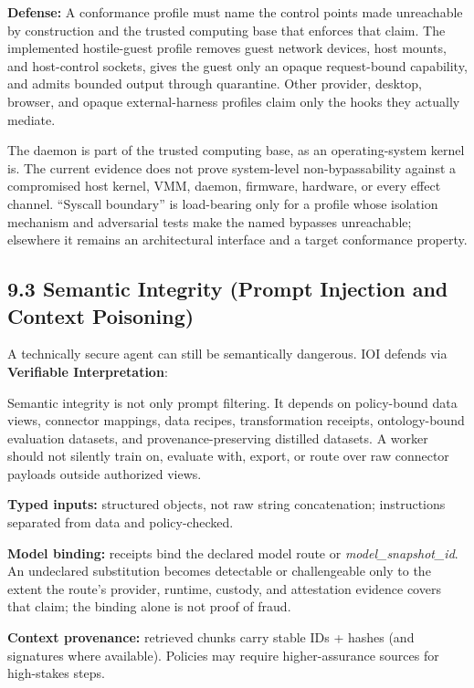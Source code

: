 \documentclass[
  11pt,
]{article}
\begin{document}
\textbf{Defense:} A conformance profile must name the control points made
unreachable by construction and the trusted computing base that enforces that
claim. The implemented hostile-guest profile removes guest network devices,
host mounts, and host-control sockets, gives the guest only an opaque
request-bound capability, and admits bounded output through quarantine. Other
provider, desktop, browser, and opaque external-harness profiles claim only the
hooks they actually mediate.

The daemon is part of the trusted computing base, as an operating-system kernel
is. The current evidence does not prove system-level non-bypassability against
a compromised host kernel, VMM, daemon, firmware, hardware, or every effect
channel. ``Syscall boundary'' is load-bearing only for a profile whose isolation
mechanism and adversarial tests make the named bypasses unreachable; elsewhere
it remains an architectural interface and a target conformance property.

\hypertarget{semantic-integrity-prompt-injection-and-context-poisoning}{%
\subsection{9.3 Semantic Integrity (Prompt Injection and Context
Poisoning)}\label{semantic-integrity-prompt-injection-and-context-poisoning}}

A technically secure agent can still be semantically dangerous. IOI
defends via \textbf{Verifiable Interpretation}:

Semantic integrity is not only prompt filtering. It depends on
policy-bound data views, connector mappings, data recipes,
transformation receipts, ontology-bound evaluation datasets, and
provenance-preserving distilled datasets. A worker should not silently
train on, evaluate with, export, or route over raw connector payloads
outside authorized views.

\textbf{Typed inputs: }structured objects, not raw string concatenation;
instructions separated from data and policy-checked.

\textbf{Model binding: }receipts bind the declared model route or
\emph{model\_snapshot\_id}. An undeclared substitution becomes detectable or
challengeable only to the extent the route's provider, runtime, custody, and
attestation evidence covers that claim; the binding alone is not proof of
fraud.

\textbf{Context provenance:} retrieved chunks carry stable IDs + hashes
(and signatures where available). Policies may require higher-assurance
sources for high-stakes steps.
\end{document}
